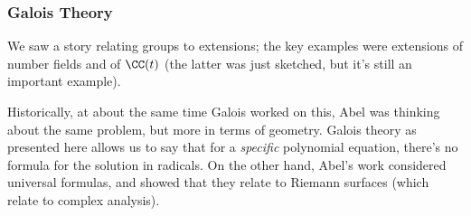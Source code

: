 \subsubsection{Galois Theory}

We saw a story relating groups to extensions; the key examples were extensions of number fields and of $\CC(t)$ (the latter was just sketched, but it's still an important example). 

Historically, at about the same time Galois worked on this, Abel was thinking about the same problem, but more in terms of geometry. Galois theory as presented here allows us to say that for a \emph{specific} polynomial equation, there's no formula for the solution in radicals. On the other hand, Abel's work considered universal formulas, and showed that they relate to Riemann surfaces (which relate to complex analysis). 
